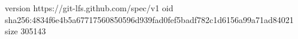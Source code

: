 version https://git-lfs.github.com/spec/v1
oid sha256:4834f6e4b5a67717560850596d939fad0fef5badf782c1d6156a99a71ad84021
size 305143
